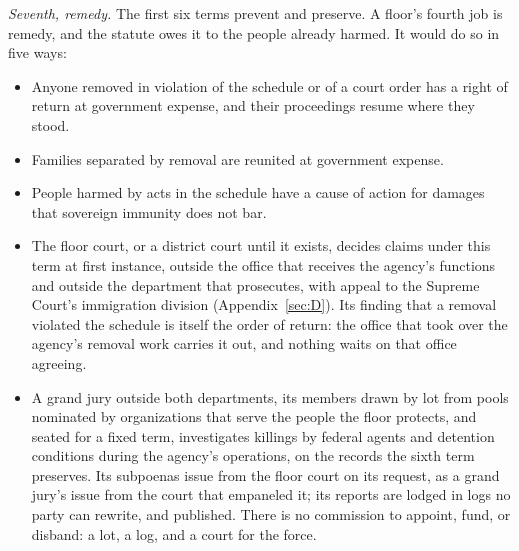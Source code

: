 \emph{Seventh, remedy.} The first six terms prevent and preserve. A floor's fourth job is remedy, and the statute owes it to the people already harmed. It would do so in five ways:

\begin{itemize}
\item Anyone removed in violation of the schedule or of a court order has a right of return at government expense, and their proceedings resume where they stood.
\item Families separated by removal are reunited at government expense.
\item People harmed by acts in the schedule have a cause of action for damages that sovereign immunity does not bar.
\item The floor court, or a district court until it exists, decides claims under this term at first instance, outside the office that receives the agency's functions and outside the department that prosecutes, with appeal to the Supreme Court's immigration division (Appendix~\ref{sec:D}). Its finding that a removal violated the schedule is itself the order of return: the office that took over the agency's removal work carries it out, and nothing waits on that office agreeing.
\item A grand jury outside both departments, its members drawn by lot from pools nominated by organizations that serve the people the floor protects, and seated for a fixed term, investigates killings by federal agents and detention conditions during the agency's operations, on the records the sixth term preserves. Its subpoenas issue from the floor court on its request, as a grand jury's issue from the court that empaneled it; its reports are lodged in logs no party can rewrite, and published. There is no commission to appoint, fund, or disband: a lot, a log, and a court for the force.
\end{itemize}

